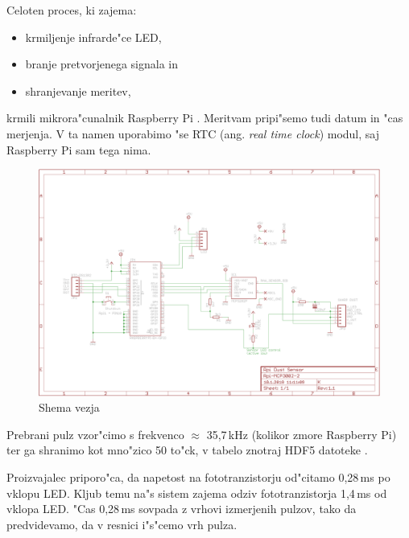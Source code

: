 \documentclass[11pt,a4paper]{article}
\begin{document}
Celoten proces, ki zajema:
\begin{itemize}
	\item krmiljenje infrarde"ce LED,
	\item branje pretvorjenega signala in
	\item shranjevanje meritev,
\end{itemize}

krmili mikrora"cunalnik Raspberry Pi \cite{rbpi-wiki}. Meritvam pripi"semo tudi datum in "cas merjenja. V ta namen uporabimo "se RTC (ang. \textit{real time clock}) modul, saj Raspberry Pi sam tega nima.


\begin{figure}[H]
	\begin{center}
		\includegraphics[width=12cm]{scheme.png}
		\caption{Shema vezja}
	\end{center}
\end{figure}

Prebrani pulz vzor"cimo s frekvenco $ \approx $ 35,7\,kHz (kolikor zmore Raspberry Pi) ter ga shranimo kot mno"zico 50 to"ck, v tabelo znotraj HDF5 datoteke \cite{hdf5}.

Proizvajalec priporo"ca, da napetost na fototranzistorju od"citamo 0,28\,ms po vklopu LED. Kljub temu na"s sistem zajema odziv fototranzistorja 1,4\,ms od vklopa LED. "Cas 0,28\,ms sovpada z vrhovi izmerjenih pulzov, tako da predvidevamo, da v resnici i"s"cemo vrh pulza. 
\end{document}
